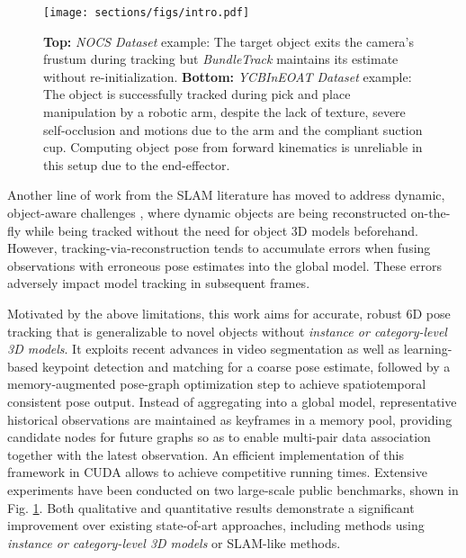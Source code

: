 \documentclass[letterpaper, 10 pt, conference]{ieeeconf}
\begin{document}
\begin{figure}[t]
  \centering
  \texttt{[image: sections/figs/intro.pdf]}
  \vspace{-0.25in}
  \caption{\textbf{Top:} \textit{NOCS Dataset} \cite{Wang_2019_CVPR} example: The target object exits the camera's frustum during tracking but \textit{BundleTrack} maintains its estimate without re-initialization. \textbf{Bottom:} \textit{YCBInEOAT Dataset} \cite{wense3tracknet} example: The object is successfully tracked during pick and place manipulation by a robotic arm, despite the lack of texture, severe self-occlusion and motions due to the arm and the compliant suction cup. Computing object pose from forward kinematics is unreliable in this setup due to the end-effector.}
  \label{fig:intro}
  \vspace{-0.3in}
\end{figure}

Another line of work from the SLAM literature has moved to address dynamic, object-aware challenges \cite{xu2019mid, runz2018maskfusion, ma2015simultaneous, runz2017co}, where dynamic objects are being reconstructed on-the-fly while being tracked without the need for object 3D models beforehand. However, tracking-via-reconstruction \cite{runz2017co,runz2018maskfusion} tends to accumulate errors when fusing observations with erroneous pose estimates into the global model. These errors adversely impact model tracking in subsequent frames.

Motivated by the above limitations, this work aims for accurate, robust 6D pose tracking that is generalizable to novel objects without \textit{instance or category-level 3D models}. It exploits recent advances in video segmentation as well as learning-based keypoint detection and matching for a coarse pose estimate, followed by a memory-augmented pose-graph optimization step to achieve spatiotemporal consistent pose output. Instead of aggregating into a global model, representative historical observations are maintained as keyframes in a memory pool, providing candidate nodes for future graphs so as to enable multi-pair data association together with the latest observation. An efficient implementation of this framework in CUDA allows to achieve competitive running times. Extensive experiments have been conducted on two large-scale public benchmarks, shown in Fig. \ref{fig:intro}. Both qualitative and quantitative results demonstrate a significant improvement over existing state-of-art approaches, including methods using \textit{instance or category-level 3D models} or SLAM-like methods. 
\end{document}
